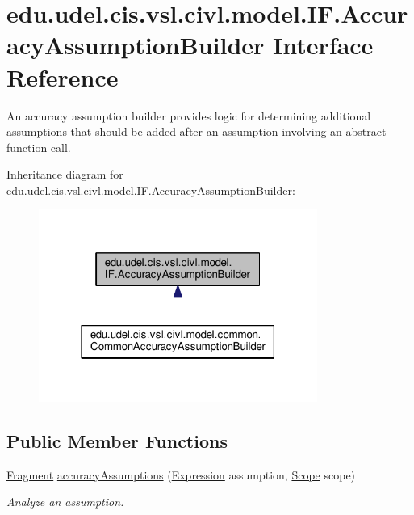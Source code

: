 \hypertarget{interfaceedu_1_1udel_1_1cis_1_1vsl_1_1civl_1_1model_1_1IF_1_1AccuracyAssumptionBuilder}{}\section{edu.\+udel.\+cis.\+vsl.\+civl.\+model.\+I\+F.\+Accuracy\+Assumption\+Builder Interface Reference}
\label{interfaceedu_1_1udel_1_1cis_1_1vsl_1_1civl_1_1model_1_1IF_1_1AccuracyAssumptionBuilder}


An accuracy assumption builder provides logic for determining additional assumptions that should be added after an assumption involving an abstract function call.  




Inheritance diagram for edu.\+udel.\+cis.\+vsl.\+civl.\+model.\+I\+F.\+Accuracy\+Assumption\+Builder\+:
\nopagebreak
\begin{figure}[H]
\begin{center}
\leavevmode
\includegraphics[width=259pt]{interfaceedu_1_1udel_1_1cis_1_1vsl_1_1civl_1_1model_1_1IF_1_1AccuracyAssumptionBuilder__inherit__graph}
\end{center}
\end{figure}
\subsection*{Public Member Functions}
\begin{DoxyCompactItemize}
\item 
\hyperlink{interfaceedu_1_1udel_1_1cis_1_1vsl_1_1civl_1_1model_1_1IF_1_1Fragment}{Fragment} \hyperlink{interfaceedu_1_1udel_1_1cis_1_1vsl_1_1civl_1_1model_1_1IF_1_1AccuracyAssumptionBuilder_a55574da8c81d81379e9ec4e7ddf90f32}{accuracy\+Assumptions} (\hyperlink{interfaceedu_1_1udel_1_1cis_1_1vsl_1_1civl_1_1model_1_1IF_1_1expression_1_1Expression}{Expression} assumption, \hyperlink{interfaceedu_1_1udel_1_1cis_1_1vsl_1_1civl_1_1model_1_1IF_1_1Scope}{Scope} scope)
\begin{DoxyCompactList}\small\item\em Analyze an assumption. \end{DoxyCompactList}\end{DoxyCompactItemize}


